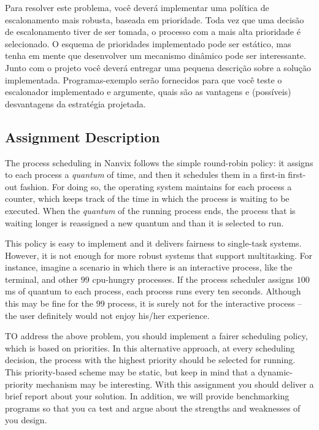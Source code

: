 \documentclass[11pt]{article}
\newif\ifen
\begin{document}
		Para resolver este problema, você deverá implementar uma política de
		escalonamento mais robusta, baseada em prioridade. Toda vez que uma
		decisão de escalonamento tiver de ser tomada, o processo com a mais
		alta prioridade é selecionado. O esquema de prioridades implementado
		pode ser estático, mas tenha em mente que desenvolver um mecanismo
		dinâmico pode ser interessante. Junto com o projeto você deverá
		entregar uma pequena descrição sobre a solução implementada.
		Programas-exemplo serão fornecidos para que você teste o escalonador
		implementado e argumente, quais são as vantagens e (possíveis)
		desvantagens da estratégia projetada.
\else\ifen

	\subsection*{Assignment Description}

		The process scheduling in Nanvix follows the simple round-robin
		policy: it assigns to each process a \textit{quantum} of time, and
		then it schedules them in a first-in first-out fashion. For
		doing so, the operating system maintains for each process a
		counter, which keeps track of the time in which the process is
		waiting to be executed. When the \textit{quantum} of the running
		process ends, the process that is waiting longer is reassigned a
		new quantum and than it is selected to run.

		This policy is easy to implement and it delivers fairness to
		single-task systems. However, it is not enough for more robust
		systems that support multitasking. For instance, imagine a
		scenario in which there is an interactive process, like the
		terminal, and other $99$ cpu-hungry processes. If the process
		scheduler assigns $100$ ms of quantum to each process, each
		process runs every ten seconds. Although this may be fine for
		the $99$ process, it is surely not for the interactive process
		-- the user definitely would not enjoy his/her experience.

		TO address the above problem, you should implement a fairer
		scheduling policy, which is based on priorities. In this
		alternative approach, at every scheduling decision, the process
		with the highest priority should be selected for running. This
		priority-based scheme may be static, but keep in mind that a
		dynamic-priority mechanism may be interesting. With this
		assignment you should deliver a brief report about your
		solution. In addition, we will provide benchmarking programs so that
		you ca test and argue about the strengths and weaknesses of you
		design.
\end{document}

